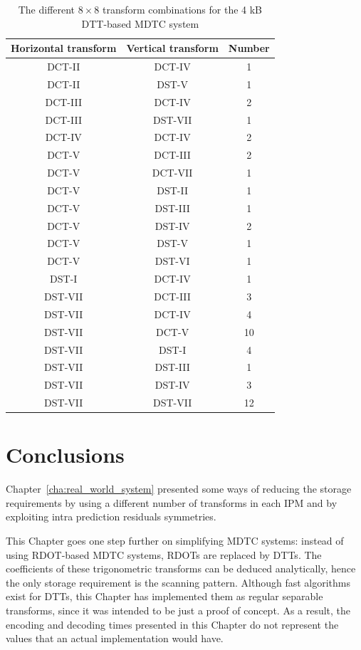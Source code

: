 \documentclass[11pt,a4paper,openright,twoside]{book}
\numberwithin{equation}{section} %
\numberwithin{figure}{section} %
\numberwithin{table}{section} %
\begin{document}
\begin{table}[tb]
	\centering
	\small
	\begin{tabular}{cc|c}
		Horizontal transform & Vertical transform & Number \\
		\hline\hline
		DCT-II  & DCT-IV  & 1  \\
		DCT-II  & DST-V   & 1  \\
		DCT-III & DCT-IV  & 2  \\
		DCT-III & DST-VII & 1  \\
		DCT-IV  & DCT-IV  & 2  \\
		DCT-V   & DCT-III & 2  \\
		DCT-V   & DCT-VII & 1  \\
		DCT-V   & DST-II  & 1  \\
		DCT-V   & DST-III & 1  \\
		DCT-V   & DST-IV  & 2  \\
		DCT-V   & DST-V   & 1  \\
		DCT-V   & DST-VI  & 1  \\
		DST-I   & DCT-IV  & 1  \\
		DST-VII & DCT-III & 3  \\
		DST-VII & DCT-IV  & 4  \\
		DST-VII & DCT-V   & 10 \\
		DST-VII & DST-I   & 4  \\
		DST-VII & DST-III & 1  \\
		DST-VII & DST-IV  & 3  \\
		DST-VII & DST-VII & 12 \\
	\end{tabular}
	\caption{The different $8\times8$ transform combinations for the 4
	kB \acs{DTT}-based \acs{MDTC} system}
	\label{tab:dtt_combinations_8}
\end{table}

\section{Conclusions}
\label{sec:dtt_conclusions}

Chapter~\ref{cha:real_world_system} presented some ways of reducing the
storage requirements by using a different number of transforms in each
\ac{IPM} and by exploiting intra prediction residuals symmetries.

This Chapter goes one step further on simplifying \ac{MDTC} systems:
instead of using \ac{RDOT}-based \ac{MDTC} systems, \acp{RDOT} are replaced by
\acp{DTT}.
The coefficients of these trigonometric transforms can be deduced
analytically, hence the only storage requirement is the scanning pattern.
Although fast algorithms exist for \acp{DTT}, this Chapter has implemented
them as regular separable transforms, since it was intended to be just a proof
of concept.
As a result, the encoding and decoding times presented in this Chapter do not
represent the values that an actual implementation would have.
\end{document}
